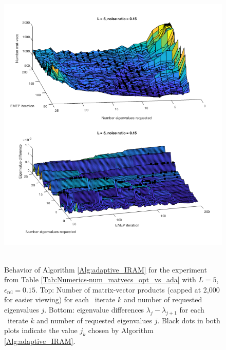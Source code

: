 \begin{enumerate}
\begin{figure}[H]
\centering
\hbox{\hspace{-0.5cm} \includegraphics[scale=0.65]{Numerics-surf_num_mvs_and_eig_diffs_1} }\vspace{0.0cm}
	\caption{Behavior of Algorithm \ref{Alg:adaptive_IRAM} for the experiment from Table \ref{Tab:Numerics-num_matvecs_opt_vs_ada} with $L=5$, $\epsilon_\text{rel}=0.15$.  Top: Number of matrix-vector products (capped at 2,000 for easier viewing) for each \emep \ iterate $k$ and number of requested eigenvalues $j$. Bottom: eigenvalue differences $\lambda_j - \lambda_{j+1}$ for each \emep \ iterate $k$ and number of requested eigenvalues $j$.  Black dots in both plots indicate the value $j_k$ chosen by Algorithm \ref{Alg:adaptive_IRAM}.}
\label{Fig:Numerics-surf_mvs_eig_diffs_1}
\end{figure}




\end{enumerate}
